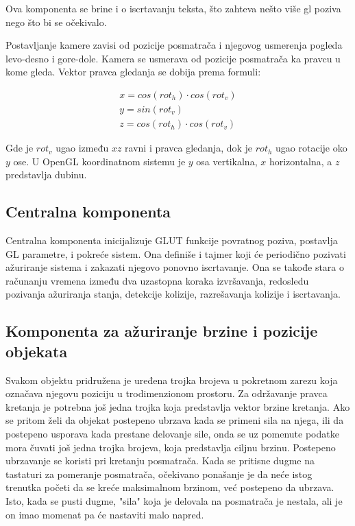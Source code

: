 \documentclass[12pt,oneside]{memoir}
\begin{document}
Ova komponenta se brine i o iscrtavanju teksta, što zahteva nešto više gl poziva nego što bi se očekivalo.

Postavljanje kamere zavisi od pozicije posmatrača i njegovog usmerenja pogleda levo-desno i gore-dole.
Kamera se usmerava od pozicije posmatrača ka pravcu u kome gleda.
Vektor pravca gledanja se dobija prema formuli:

\begin{equation}
\label{eq:camera}
\begin{split}
x = cos(rot_h) \cdot cos(rot_v) \\
y = sin(rot_v) \\
z = cos(rot_h) \cdot  cos(rot_v)	
\end{split}
\end{equation}


\noindent Gde je $rot_v$ ugao između $xz$ ravni i pravca gledanja, dok je $rot_h$ ugao rotacije oko $y$ ose.
U OpenGL koordinatnom sistemu je $y$ osa vertikalna, $x$ horizontalna, a $z$ predstavlja dubinu.

\subsection{Centralna komponenta}

Centralna komponenta inicijalizuje GLUT funkcije povratnog poziva, postavlja GL parametre, i pokreće sistem.
Ona definiše i tajmer koji će periodično pozivati ažuriranje sistema i zakazati njegovo ponovno iscrtavanje. 
Ona se takođe stara o računanju vremena između dva uzastopna koraka izvršavanja, redosledu pozivanja ažuriranja stanja,
detekcije kolizije, razrešavanja kolizije i iscrtavanja.

\subsection{Komponenta za ažuriranje brzine i pozicije objekata}

Svakom objektu pridružena je  uređena trojka brojeva u pokretnom zarezu koja označava njegovu poziciju u trodimenzionom prostoru.
Za održavanje pravca kretanja je potrebna još jedna trojka koja predstavlja vektor brzine kretanja.
Ako se pritom želi da objekat postepeno ubrzava kada se primeni sila na njega, ili da postepeno usporava 
kada prestane delovanje sile, onda se uz pomenute podatke mora čuvati još jedna trojka brojeva, koja predstavlja ciljnu brzinu.
Postepeno ubrzavanje se koristi pri kretanju posmatrača. 
Kada se pritisne dugme na tastaturi za pomeranje posmatrača, očekivano ponašanje je da neće istog trenutka 
početi da se kreće maksimalnom brzinom, već postepeno da ubrzava.
Isto, kada se pusti dugme, "sila" koja je delovala na posmatrača je nestala, ali je on imao momenat pa će
nastaviti malo napred.
\end{document}
